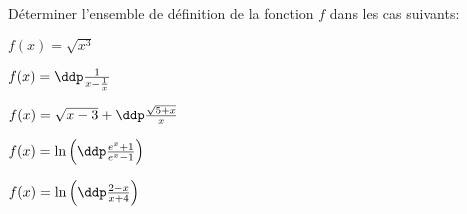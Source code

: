 
\begin{exercice}  \;
D\'eterminer l'ensemble de d\'efinition de la fonction $f$ dans les cas suivants:
\begin{enumerate}
\noindent \begin{minipage}[t]{0.4\textwidth}
 \item $f(x)=\sqrt{x^3}$
\item $f(x)= \ddp\frac{1}{x-\frac{1}{x}}$
\item $f(x)=\sqrt{x-3} +\ddp\frac{\sqrt{5+x}}{x} $
\end{minipage}
\begin{minipage}[t]{0.4\textwidth}
 \item $f(x)=\ln{\left(\ddp\frac{e^x+1}{e^x-1}\right)}$
 \item $f(x)=\ln{\left(\ddp\frac{2-x}{x+4}\right)}$
\end{minipage}
\end{enumerate}
\end{exercice}